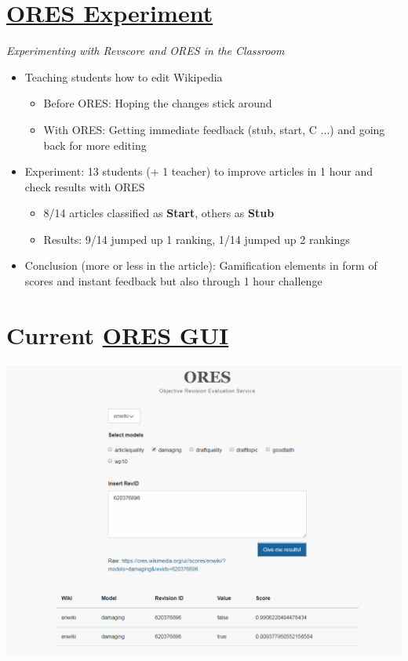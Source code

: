 \documentclass[12pt,a4paper]{article}
\begin{document}
\section{\href{https://en.wikipedia.org/wiki/User:Fuzheado/ORES_experiment}{ORES Experiment}}
\textit{Experimenting with Revscore and ORES in the Classroom}
\begin{itemize}
\item Teaching students how to edit Wikipedia
\begin{itemize}
\item Before ORES: Hoping the changes stick around
\item With ORES: Getting immediate feedback (stub, start, C ...) and going back for more editing
\end{itemize}
\item Experiment: 13 students (+ 1 teacher) to improve articles in 1 hour and check results with ORES
\begin{itemize}
\item 8/14 articles classified as \textbf{Start}, others as \textbf{Stub}
\item Results: 9/14 jumped up 1 ranking, 1/14 jumped up 2 rankings
\end{itemize}
\item Conclusion (more or less in the article): Gamification elements in form of scores and instant feedback but also through 1 hour challenge
\end{itemize}
\section{Current \href{https://ores.wikimedia.org/ui/}{ORES GUI}}
\includegraphics[scale=0.35]{resources/1/ORESGUI.png}
\end{document}
